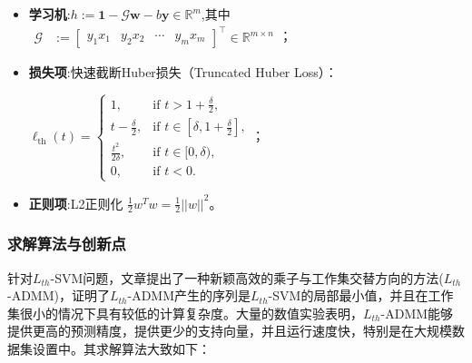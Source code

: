 \documentclass[12pt]{article}  %
\begin{document}
\begin{itemize}
	\setlength{\parsep}{0ex} %
	\setlength{\topsep}{2ex} %
	\setlength{\itemsep}{1ex} %
	\item \textbf{学习机}:$h:= \mathbf{1} - \mathcal{G}\mathbf{w} - b\mathbf{y} \in \mathbb{R}^{m} $,其中$\begin{aligned}  
				\mathcal{G} &:= \left[ \begin{array}{cccc}  
					y_{1}x_{1} & y_{2}x_{2} & \cdots & y_{m}x_{m}  
				\end{array} \right]^{\top} \in \mathbb{R}^{m \times n}
		\end{aligned}  $；		
	\item \textbf{损失项}:快速截断Huber损失（Truncated Huber Loss）：
	
	$\ell_{\text{th}}(t) = \begin{cases}   
		1, & \text{if } t > 1 + \frac{\delta}{2}, \\  
		t - \frac{\delta}{2}, & \text{if } t \in \left[\delta, 1 + \frac{\delta}{2}\right], \\  
		\frac{t^2}{2\delta}, & \text{if } t \in [0, \delta), \\  
		0, & \text{if } t < 0.   
	\end{cases}$；
	
	\item \textbf{正则项}:L2正则化 $\frac{1}{2}w^Tw={\frac{1}{2}||w||}^2$。
\end{itemize}

\subsubsection{求解算法与创新点}

针对$L_{th}$-SVM问题，文章提出了一种新颖高效的乘子与工作集交替方向的方法($L_{th}$-ADMM)，证明了$L_{th}$-ADMM产生的序列是$L_{th}$-SVM的局部最小值，并且在工作集很小的情况下具有较低的计算复杂度。大量的数值实验表明，$L_{th}$-ADMM能够提供更高的预测精度，提供更少的支持向量，并且运行速度快，特别是在大规模数据集设置中。其求解算法大致如下：  
	
\end{document}
